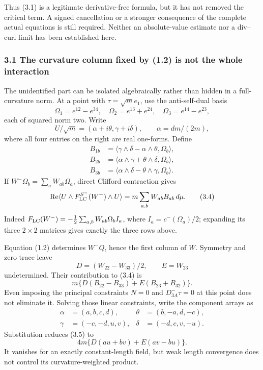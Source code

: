 \documentclass[
  10pt,
]{article}
\begin{document}
Thus (3.1) is a legitimate derivative-free formula, but it has not
removed the critical term. A signed cancellation or a stronger
consequence of the complete actual equations is still required. Neither
an absolute-value estimate nor a div--curl limit has been established
here.

\hypertarget{the-curvature-column-fixed-by-1.2-is-not-the-whole-interaction}{%
\subsubsection{3.1 The curvature column fixed by (1.2) is not the whole
interaction}\label{the-curvature-column-fixed-by-1.2-is-not-the-whole-interaction}}

The unidentified part can be isolated algebraically rather than hidden
in a full-curvature norm. At a point with \(\tau=\sqrt m e_1\), use the
anti-self-dual basis \[
 \Omega_1=e^{12}-e^{34},\quad
 \Omega_2=e^{13}+e^{24},\quad
 \Omega_3=e^{14}-e^{23},
\] each of squared norm two. Write \[
 U/\sqrt m=(\alpha+i\theta,\gamma+i\delta),\qquad
 \alpha=dm/(2m),
\] where all four entries on the right are real one-forms. Define \[
\begin{aligned}
 B_{1b}&=\langle\gamma\wedge\delta-\alpha\wedge\theta,\Omega_b\rangle,\\
 B_{2b}&=\langle\alpha\wedge\gamma+\theta\wedge\delta,\Omega_b\rangle,\\
 B_{3b}&=\langle\alpha\wedge\delta-\theta\wedge\gamma,\Omega_b\rangle.
\end{aligned}
\] If \(W^-\Omega_b=\sum_a W_{ab}\Omega_a\), direct Clifford contraction
gives \[
 \operatorname{Re}\langle U\wedge F_{\rm LC}^{S^-}(W^-)\wedge U\rangle
          =m\sum_{a,b}W_{ab}B_{ab}\,d\mu .                  \tag{3.4}
\] Indeed \(F_{\rm LC}(W^-)=-\tfrac12\sum_{a,b}W_{ab}\Omega_b I_a\),
where \(I_a=c^-(\Omega_a)/2\); expanding its three \(2\times2\) matrices
gives exactly the three rows above.

Equation (1.2) determines \(W^-Q\), hence the first column of \(W\).
Symmetry and zero trace leave \[
 D=(W_{22}-W_{33})/2,\qquad E=W_{23}
\] undetermined. Their contribution to (3.4) is \[
 m\{D(B_{22}-B_{33})+E(B_{23}+B_{32})\}.                \tag{3.5}
\] Even imposing the principal constraints \(N=0\) and
\(D^-_{3A}\tau=0\) at this point does not eliminate it. Solving those
linear constraints, write the component arrays as \[
\begin{aligned}
 \alpha&=(a,b,c,d),&\theta&=(b,-a,d,-c),\\
 \gamma&=(-c,-d,u,v),&\delta&=(-d,c,v,-u).
\end{aligned}
\] Substitution reduces (3.5) to \[
               4m\{D(au+bv)+E(av-bu)\}.                \tag{3.6}
\] It vanishes for an exactly constant-length field, but weak length
convergence does not control its curvature-weighted product.
\end{document}
